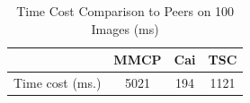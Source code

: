 \begin{table}[th]
\centering
\caption{Time Cost Comparison to Peers on 100 Images (ms)}
\small
\begin{tabular}{|l|c|c|c|}
\hline
{\bf } &   MMCP &   Cai &  {\bf TSC} \\
\hline
 Time cost (ms.) &            5021  &       194  &      1121    \\
\hline
\end{tabular}
\label{tab:timepeer}
\end{table}


